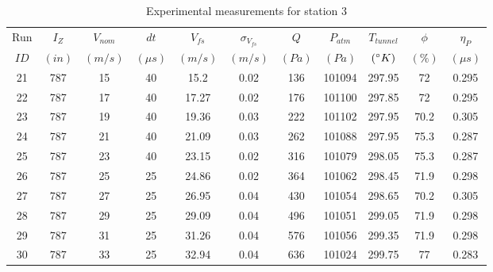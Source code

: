\renewcommand\baselinestretch{1.3}\selectfont
\begin{table}[H]
\begin{center}
\begin{tabular}{|ccccccccccc|}
	\hline
	Run & $I_Z$ & $V_{nom}$ & $dt$ & $V_{fs}$ & $\sigma_{V_{fs}}$ & $Q$ & $P_{atm}$ & $T_{tunnel}$ & $\phi$ & $\eta_P$\\
	$ID$ & $(in)$ & $(m/s)$ & $(\mu s)$ & $(m/s)$ & $(m/s)$ & $(Pa)$ & $(Pa)$ & $(\degree K)$ & $(\%)$ & $(\mu s)$\\
	\hline
	21 & 787 & 15 & 40 & 15.2 & 0.02 & 136 & 101094 & 297.95 & 72 & 0.295\\
	22 & 787 & 17 & 40 & 17.27 & 0.02 & 176 & 101100 & 297.85 & 72 & 0.295\\
	23 & 787 & 19 & 40 & 19.36 & 0.03 & 222 & 101102 & 297.95 & 70.2 & 0.305\\
	24 & 787 & 21 & 40 & 21.09 & 0.03 & 262 & 101088 & 297.95 & 75.3 & 0.287\\
	25 & 787 & 23 & 40 & 23.15 & 0.02 & 316 & 101079 & 298.05 & 75.3 & 0.287\\
	26 & 787 & 25 & 25 & 24.86 & 0.02 & 364 & 101062 & 298.45 & 71.9 & 0.298\\
	27 & 787 & 27 & 25 & 26.95 & 0.04 & 430 & 101054 & 298.65 & 70.2 & 0.305\\
	28 & 787 & 29 & 25 & 29.09 & 0.04 & 496 & 101051 & 299.05 & 71.9 & 0.298\\
	29 & 787 & 31 & 25 & 31.26 & 0.04 & 576 & 101056 & 299.35 & 71.9 & 0.298\\
	30 & 787 & 33 & 25 & 32.94 & 0.04 & 636 & 101024 & 299.75 & 77 & 0.283\\
	\hline
\end{tabular}
\caption{Experimental measurements for station 3}
\label{table:station_3_measurements}
\end{center}
\end{table}
\renewcommand\baselinestretch{2}\selectfont
